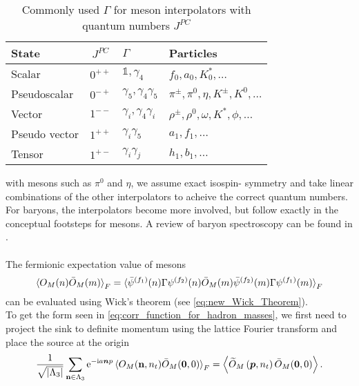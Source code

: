 \documentclass[a4paper,10pt]{article}
\begin{document}
\begin{table}[H]
\centering
\caption{Commonly used $\Gamma$ for meson interpolators with quantum numbers $J^{PC}$ \cite{Gattringer:2010zz}}
\begin{tabular}{lcll}
\hline State & $J^{P C}$ & $\Gamma$ & Particles \\
\hline Scalar & $0^{++}$ & $\mathbb{1}, \gamma_{4}$ & $f_{0}, a_{0}, K_{0}^{*}, \ldots$ \\
Pseudoscalar & $0^{-+}$ & $\gamma_{5}, \gamma_{4} \gamma_{5}$ & $\pi^{\pm}, \pi^{0}, \eta, K^{\pm}, K^{0}, \ldots$ \\
Vector & $1^{--}$ & $\gamma_{i}, \gamma_{4} \gamma_{i}$ & $\rho^{\pm}, \rho^{0}, \omega, K^{*}, \phi, \ldots$ \\
Pseudo vector & $1^{++}$ & $\gamma_{i} \gamma_{5}$ & $a_{1}, f_{1}, \ldots$ \\
Tensor & $1^{+-}$ & $\gamma_{i} \gamma_{j}$ & $h_{1}, b_{1}, \ldots$ \\
\hline
\end{tabular}\label{table:Interpolator_gammas}
\end{table}
with mesons such as $\pi^0$ and $\eta$, we assume exact isospin- symmetry and take linear combinations of the other interpolators to acheive the correct quantum numbers.\\For baryons, the interpolators become more involved, but follow exactly in the conceptual footsteps for mesons. A review of baryon spectroscopy can be found in \cite{leinweber2005baryon}.\\\\
The fermionic expectation value of mesons
\begin{equation}
\braket{O_{M}(n) \bar{O}_{M}(m)}_{F} = \braket{\bar{\psi}^{\left(f_{1}\right)}(n) \Gamma \psi^{\left(f_{2}\right)}(n)\\ \bar{O}_{M}(m)\bar{\psi}^{\left(f_{2}\right)}(m) \Gamma \psi^{\left(f_{1}\right)}(m)}_{F}
\end{equation}
can be evaluated using Wick's theorem (see \eqref{eq:new_Wick_Theorem}).\\To get the form seen in \eqref{eq:corr_function_for_hadron_masses}, we first need to project the sink to definite momentum using the lattice Fourier transform and place the source at the origin
\begin{equation}
\frac{1}{\sqrt{\left|\Lambda_{3}\right|}} \sum_{\mathbf{n} \in \Lambda_{3}} \mathrm{e}^{-\mathrm{i} a \boldsymbol{n} p}\braket{O_{M}(\mathbf{n},n_t) \bar{O}_{M}(\mathbf{0},0)}_{F} = \left\langle\widetilde{O}_M\left(\boldsymbol{p}, n_{t}\right) \bar{O}_M(\mathbf{0}, 0)\right\rangle.
\end{equation}
\end{document}

